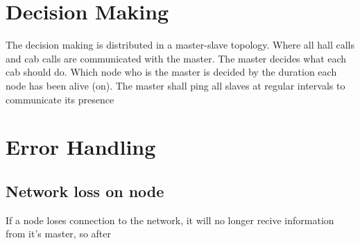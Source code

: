 \section{Decision Making}

The decision making is distributed in a master-slave topology. Where all hall calls and cab calls are communicated with the master. The master decides what each cab should do. Which node who is the master is decided by the duration each node has been alive (on). The master shall ping all slaves at regular intervals to communicate its presence 



\section{Error Handling}

\subsection{Network loss on node}
If a node loses connection to the network, it will no longer recive information from it's master, so after 